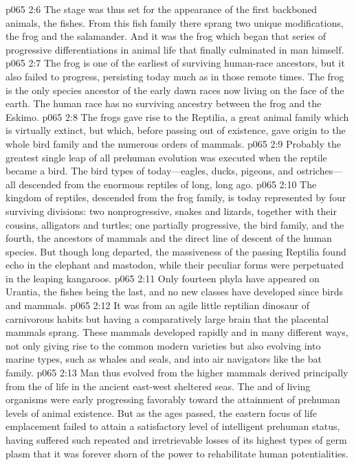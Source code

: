 \pc \vs p065 2:6 The stage was thus set for the appearance of the first backboned animals, the fishes. From this fish family there sprang two unique modifications, the frog and the salamander. And it was the frog which began that series of progressive differentiations in animal life that finally culminated in man himself.
\vs p065 2:7 The frog is one of the earliest of surviving human\hyp{}race ancestors, but it also failed to progress, persisting today much as in those remote times. The frog is the only species ancestor of the early dawn races now living on the face of the earth. The human race has no surviving ancestry between the frog and the Eskimo.
\pc \vs p065 2:8 The frogs gave rise to the Reptilia, a great animal family which is virtually extinct, but which, before passing out of existence, gave origin to the whole bird family and the numerous orders of mammals.
\vs p065 2:9 Probably the greatest single leap of all prehuman evolution was executed when the reptile became a bird. The bird types of today---eagles, ducks, pigeons, and ostriches---all descended from the enormous reptiles of long, long ago.
\vs p065 2:10 The kingdom of reptiles, descended from the frog family, is today represented by four surviving divisions: two nonprogressive, snakes and lizards, together with their cousins, alligators and turtles; one partially progressive, the bird family, and the fourth, the ancestors of mammals and the direct line of descent of the human species. But though long departed, the massiveness of the passing Reptilia found echo in the elephant and mastodon, while their peculiar forms were perpetuated in the leaping kangaroos.
\pc \vs p065 2:11 Only fourteen phyla have appeared on Urantia, the fishes being the last, and no new classes have developed since birds and mammals.
\pc \vs p065 2:12 It was from an agile little reptilian dinosaur of carnivorous habits but having a comparatively large brain that the placental mammals  sprang. These mammals developed rapidly and in many different ways, not only giving rise to the common modern varieties but also evolving into marine types, such as whales and seals, and into air navigators like the bat family.
\vs p065 2:13 Man thus evolved from the higher mammals derived principally from the  of life in the ancient east\hyp{}west sheltered seas. The  and  of living organisms were early progressing favorably toward the attainment of prehuman levels of animal existence. But as the ages passed, the eastern focus of life emplacement failed to attain a satisfactory level of intelligent prehuman status, having suffered such repeated and irretrievable losses of its highest types of germ plasm that it was forever shorn of the power to rehabilitate human potentialities.
